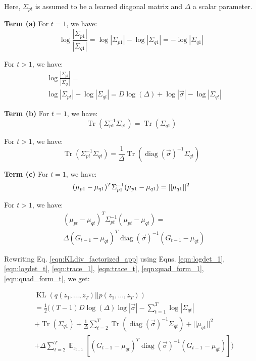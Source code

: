 \documentclass[letterpaper]{article}
\newcommand{\Exp}[2]{\mathop{\mathbb{E}}_{#2}\left[#1\right]}
\newcommand{\vsigma}{\vec{\sigma}}
\DeclareMathOperator{\diag}{diag}
\DeclareMathOperator{\KL}{KL}
\newcommand{\dt}{\Delta}
\DeclareMathOperator{\Tr}{Tr}
\newcommand{\Prec}[1]{{\Sigma}_{#1}^{-1}}
\theoremstyle{plain}
\begin{document}
{Here, $\Sigma_{pt}$ is assumed to be a learned diagonal matrix and $\dt$ a scalar parameter.  

\textbf{Term (a)}
For $t=1$, we have:
\begin{equation}
\label{eqn:logdet_1}
\log\frac{|\Sigma_{p1}|}{|\Sigma_{q1}|} = \log|\Sigma_{p1}|-\log|\Sigma_{q1}| = -\log|\Sigma_{q1}|
\end{equation}

For $t>1$, we have:
\begin{align}
	\label{eqn:logdet_t}
	&\log\frac{|\Sigma_{pt}|}{|\Sigma_{qt}|} = \nonumber\\
	&\log|\Sigma_{pt}|-\log|\Sigma_{qt}|= D \log(\dt) + \log|\vsigma| -\log|\Sigma_{qt}|
\end{align}

\textbf{Term (b)}
For $t=1$, we have:
\begin{equation}
	\label{eqn:trace_1}
	\Tr(\Prec{p1}\Sigma_{q1}) = \Tr(\Sigma_{q1})
\end{equation}

For $t>1$, we have: 
\begin{equation}
	\label{eqn:trace_t}
	\Tr(\Prec{pt}\Sigma_{qt}) = \frac{1}{\dt}\Tr(\diag(\vsigma)^{-1}\Sigma_{qt})
\end{equation}

\textbf{Term (c)}
For $t=1$, we have:
\begin{equation}
	\label{eqn:quad_form_1}
	(\mu_{p1}-\mu_{q1})^T\Sigma_{p1}^{-1}(\mu_{p1}-\mu_{q1}) = ||\mu_{q1}||^2\\
\end{equation}

For $t>1$, we have:
\begin{align}
	\label{eqn:quad_form_t}
	&(\mu_{pt}-\mu_{qt})^T\Sigma_{pt}^{-1}(\mu_{pt}-\mu_{qt}) = \\
	&\dt (G_{t-1}-\mu_{qt})^T\diag(\vsigma)^{-1}(G_{t-1}-\mu_{qt})\nonumber
\end{align}

Rewriting Eq. \ref{eqn:KLdiv_factorized_app} using Eqns. \ref{eqn:logdet_1}, \ref{eqn:logdet_t}, \ref{eqn:trace_1}, \ref{eqn:trace_t}, \ref{eqn:quad_form_1}, \ref{eqn:quad_form_t}, we get:

\begin{align}
	\label{eqn:KLdiv_final}
	&\KL(q(z_1,\ldots,z_T)||p(z_1,\ldots,z_T)) \nonumber \\
	&=\frac{1}{2}((T-1)D \log(\dt)\log|\vsigma| -\sum_{t=1}^T\log|\Sigma_{qt}|  \nonumber\\
	&+ \Tr(\Sigma_{q1})+\frac{1}{\dt}\sum_{t=2}^T \Tr(\diag(\vsigma)^{-1}\Sigma_{qt})+ ||\mu_{q1}||^2 \nonumber\\
	&+ \dt \sum_{t=2}^T \Exp{(G_{t-1}-\mu_{qt})^T\diag(\vsigma)^{-1}(G_{t-1}-\mu_{qt})}{z_{t-1}} )\nonumber
\end{align}

}
\end{document}
